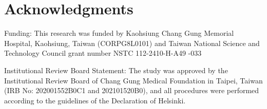 \documentclass{article}
\begin{document}
\section*{Acknowledgments}
Funding: This research was funded by Kaohsiung Chang Gung Memorial Hospital, Kaohsiung, Taiwan (CORPG8L0101) and Taiwan National Science and Technology Council grant number NSTC 112-2410-H-A49 -033

Institutional Review Board Statement: The study was approved by the Institutional Review Board of Chang Gung Medical Foundation in Taipei, Taiwan (IRB No: 202001552B0C1 and 202101520B0), and all procedures were performed according to the guidelines of the Declaration of Helsinki.

  
  
\end{document}
